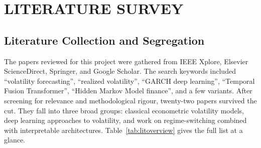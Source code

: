 \chapter{LITERATURE SURVEY}
\label{ChapterLiteratureSurvey}

\section{Literature Collection and Segregation}

The papers reviewed for this project were gathered from IEEE Xplore, Elsevier ScienceDirect, Springer, and Google Scholar. The search keywords included ``volatility forecasting'', ``realized volatility'', ``GARCH deep learning'', ``Temporal Fusion Transformer'', ``Hidden Markov Model finance'', and a few variants. After screening for relevance and methodological rigour, twenty-two papers survived the cut. They fall into three broad groups: classical econometric volatility models, deep learning approaches to volatility, and work on regime-switching combined with interpretable architectures. Table~\ref{tab:litoverview} gives the full list at a glance.

